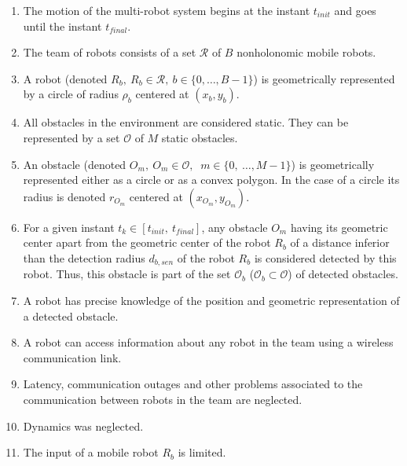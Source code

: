 \documentclass[eprint]{actapoly}
\begin{document}
\begin{enumerate}

    \item The motion of the multi-robot system begins at
    the instant $t_{init}$ and goes until the instant $t_{final}$.

    \item The team of robots consists of a set $\mathcal{R}$ of $B$
    nonholonomic mobile robots.
    
    \item A robot (denoted $R_b,\ R_b \in \mathcal{R},\ b \in \{0,\dots,B-1\}$) is 
    geometrically represented by a circle of radius $\rho_b$ centered at $(x_b, y_b)$.
        
    \item All obstacles in the environment are considered static. They can be
    represented by a set $\mathcal{O}$ of $M$ static obstacles.
    
    \item An obstacle (denoted $O_m,\ $\mbox{$O_m \in \mathcal{O}$}$,\ $
    \mbox{$m \in \{0,\ \dots, M-1\}$}) is geometrically represented either as
    a circle or as a convex polygon. In the case of a circle its radius is
    denoted $r_{O_m}$ centered at $(x_{O_m},y_{O_m})$.
    
    \item For a given instant $t_k \in [t_{init},\ t_{final}]$, any obstacle
    $O_m$ having its geometric center apart from the geometric center of the
    robot $R_b$ of a distance inferior than the detection radius $d_{b,sen}$
    of the robot $R_b$ is considered detected by this robot.
    Thus, this obstacle is part of the set $\mathcal{O}_b$
    ($\mathcal{O}_b \subset \mathcal{O}$) of detected obstacles.
    
    \item A robot has precise knowledge of the position and geometric representation of
    a detected obstacle.
    
    \item A robot can access 
    information about any robot in the team using 
    a wireless communication link.
    
    \item Latency, communication outages and other problems associated
    to the communication between robots in the team are neglected.
        
    \item Dynamics was neglected.
    
    \item The input of a mobile robot $R_b$ is limited.
    

\end{enumerate}
\end{document}
